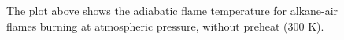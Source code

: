 \begin{figure}

\centering



\caption[- flames - II]{The plot above shows the adiabatic flame temperature for alkane-air flames burning at atmospheric pressure, without preheat (300 K).}

\label{fig:c1c3-t}

\end{figure}
